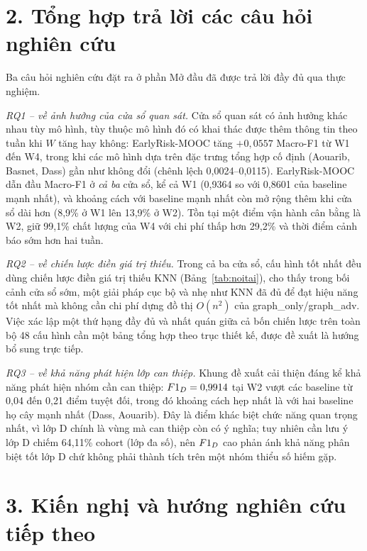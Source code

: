 \section*{2. Tổng hợp trả lời các câu hỏi nghiên cứu}

Ba câu hỏi nghiên cứu đặt ra ở phần Mở đầu đã được trả lời đầy đủ qua thực nghiệm.

\textit{RQ1 -- về ảnh hưởng của cửa sổ quan sát.} Cửa sổ quan sát có ảnh hưởng khác nhau tùy mô hình, tùy thuộc mô hình đó có khai thác được thêm thông tin theo tuần khi $W$ tăng hay không: EarlyRisk-MOOC tăng $+0{,}0557$ Macro-F1 từ W1 đến W4, trong khi các mô hình dựa trên đặc trưng tổng hợp cố định (Aouarib, Basnet, Dass) gần như không đổi (chênh lệch 0,0024--0,0115). EarlyRisk-MOOC dẫn đầu Macro-F1 ở \emph{cả ba} cửa sổ, kể cả W1 (0,9364 so với 0,8601 của baseline mạnh nhất), và khoảng cách với baseline mạnh nhất còn mở rộng thêm khi cửa sổ dài hơn (8,9\% ở W1 lên 13,9\% ở W2). Tồn tại một điểm vận hành cân bằng là W2, giữ 99,1\% chất lượng của W4 với chi phí thấp hơn 29,2\% và thời điểm cảnh báo sớm hơn hai tuần.

\textit{RQ2 -- về chiến lược điền giá trị thiếu.} Trong cả ba cửa sổ, cấu hình tốt nhất đều dùng chiến lược điền giá trị thiếu KNN (Bảng~\ref{tab:noitai}), cho thấy trong bối cảnh cửa sổ sớm, một giải pháp cục bộ và nhẹ như KNN đã đủ để đạt hiệu năng tốt nhất mà không cần chi phí dựng đồ thị $O(n^2)$ của graph\_only/graph\_adv. Việc xác lập một thứ hạng đầy đủ và nhất quán giữa cả bốn chiến lược trên toàn bộ 48 cấu hình cần một bảng tổng hợp theo trục thiết kế, được đề xuất là hướng bổ sung trực tiếp.

\textit{RQ3 -- về khả năng phát hiện lớp can thiệp.} Khung đề xuất cải thiện đáng kể khả năng phát hiện nhóm cần can thiệp: $F1_{D} = 0{,}9914$ tại W2 vượt các baseline từ 0,04 đến 0,21 điểm tuyệt đối, trong đó khoảng cách hẹp nhất là với hai baseline họ cây mạnh nhất (Dass, Aouarib). Đây là điểm khác biệt chức năng quan trọng nhất, vì lớp D chính là vùng mà can thiệp còn có ý nghĩa; tuy nhiên cần lưu ý lớp D chiếm 64,11\% cohort (lớp đa số), nên $F1_{D}$ cao phản ánh khả năng phân biệt tốt lớp D chứ không phải thành tích trên một nhóm thiểu số hiếm gặp.

\section*{3. Kiến nghị và hướng nghiên cứu tiếp theo}

